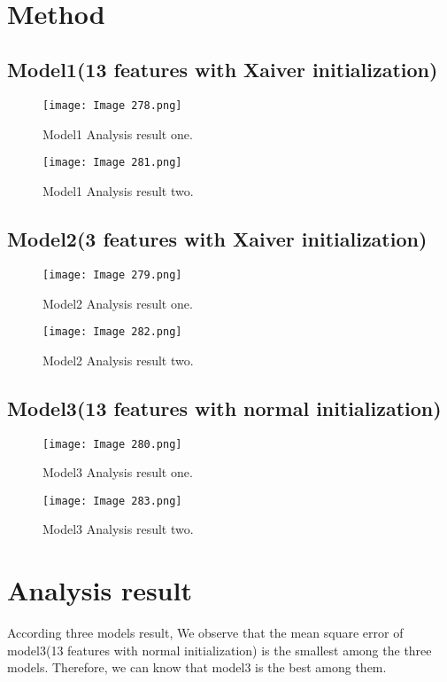 \documentclass[conference]{IEEEtran}
\begin{document}
\\
\section{Method}




\subsection{Model1(13 features with Xaiver initialization)}

\begin{figure}[htbp][H]
\centerline{\texttt{[image: Image 278.png]}}
\caption{Model1 Analysis result one.}
\label{fig1}
\end{figure}



\begin{figure}[htbp][H]
\centerline{\texttt{[image: Image 281.png]}}
\caption{Model1 Analysis result two.}
\label{fig1}
\end{figure}



\subsection{Model2(3 features with Xaiver initialization)}

\begin{figure}[htbp][H]
\centerline{\texttt{[image: Image 279.png]}}
\caption{Model2 Analysis result one.}
\label{fig2}
\end{figure}


\begin{figure}[htbp][H]
\centerline{\texttt{[image: Image 282.png]}}
\caption{Model2 Analysis result two.}
\label{fig2}
\end{figure}



\subsection{Model3(13 features with normal
initialization)}

\begin{figure}[htbp][H]
\centerline{\texttt{[image: Image 280.png]}}
\caption{Model3 Analysis result one.}
\label{fig3}
\end{figure}




\begin{figure}[htbp][H]
\centerline{\texttt{[image: Image 283.png]}}
\caption{Model3 Analysis result two.}
\label{fig3}
\end{figure}




\section{Analysis result}

According three models result, We observe that the mean square error of model3(13 features with normal
initialization) is  the smallest among the three models. Therefore, we can know that model3 is the best among them.
\end{document}
